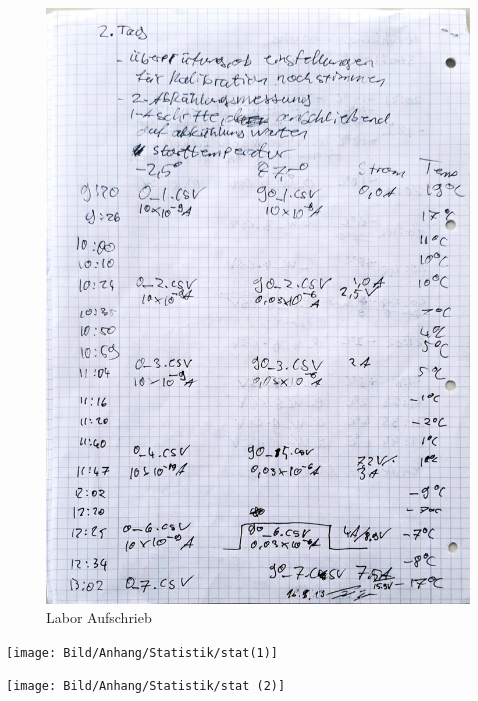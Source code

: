 \begin{figure}
	\includegraphics[scale=0.35]{Bild/Lab4}
	\centering
	\caption{Labor Aufschrieb}
\end{figure}




\begin{center}
	
		
		\begin{minipage}[t]{\textwidth}
			\begingroup
			\parfillskip=1pt
			\begin{minipage}[t]{\textwidth}
				\texttt{[image: Bild/Anhang/Statistik/stat(1)]}
			\end{minipage}%
			\hfill
			\begin{minipage}[t]{\textwidth}
				\texttt{[image: Bild/Anhang/Statistik/stat (2)]}

			\end{minipage}%
			\par\endgroup
		\end{minipage}
	
\end{center}